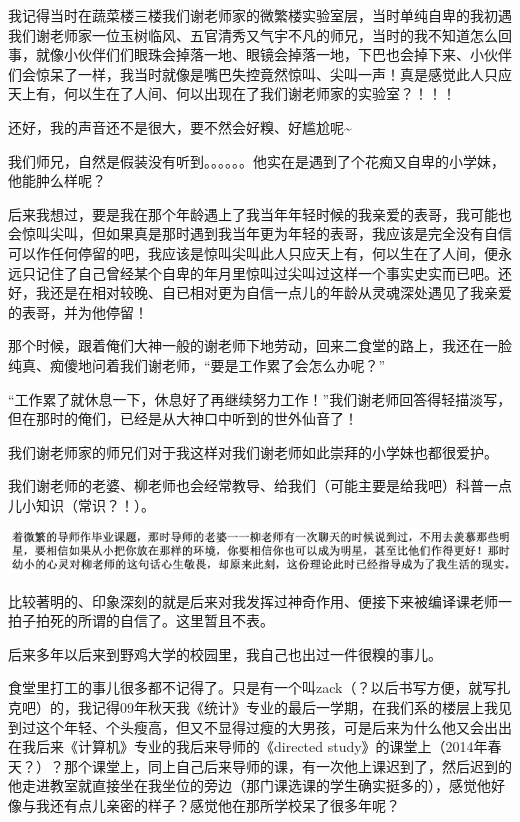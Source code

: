\documentclass[9pt, b5paper]{article}
\begin{document}
我记得当时在蔬菜楼三楼我们谢老师家的微繁楼实验室层，当时单纯自卑的我初遇我们谢老师家一位玉树临风、五官清秀又气宇不凡的师兄，当时的我不知道怎么回事，就像小伙伴们们眼珠会掉落一地、眼镜会掉落一地，下巴也会掉下来、小伙伴们会惊呆了一样，我当时就像是嘴巴失控竟然惊叫、尖叫一声！真是感觉此人只应天上有，何以生在了人间、何以出现在了我们谢老师家的实验室？！！！

还好，我的声音还不是很大，要不然会好糗、好尴尬呢\textasciitilde{}

我们师兄，自然是假装没有听到。。。。。。他实在是遇到了个花痴又自卑的小学妹，他能肿么样呢？

后来我想过，要是我在那个年龄遇上了我当年年轻时候的我亲爱的表哥，我可能也会惊叫尖叫，但如果真是那时遇到我当年更为年轻的表哥，我应该是完全没有自信可以作任何停留的吧，我应该是惊叫尖叫此人只应天上有，何以生在了人间，便永远只记住了自己曾经某个自卑的年月里惊叫过尖叫过这样一个事实史实而已吧。还好，我还是在相对较晚、自已相对更为自信一点儿的年龄从灵魂深处遇见了我亲爱的表哥，并为他停留！

那个时候，跟着俺们大神一般的谢老师下地劳动，回来二食堂的路上，我还在一脸纯真、痴傻地问着我们谢老师，“要是工作累了会怎么办呢？”

“工作累了就休息一下，休息好了再继续努力工作！”我们谢老师回答得轻描淡写，但在那时的俺们，已经是从大神口中听到的世外仙音了！

我们谢老师家的师兄们对于我这样对我们谢老师如此崇拜的小学妹也都很爱护。

我们谢老师的老婆、柳老师也会经常教导、给我们（可能主要是给我吧）科普一点儿小知识（常识？！）。

\begin{center}
\includegraphics[width=.9\linewidth]{./pic/backups_plans_20210502_171051.png}
\end{center}

比较著明的、印象深刻的就是后来对我发挥过神奇作用、便接下来被编译课老师一拍子拍死的所谓的自信了。这里暂且不表。 

后来多年以后来到野鸡大学的校园里，我自己也出过一件很糗的事儿。

食堂里打工的事儿很多都不记得了。只是有一个叫zack（？以后书写方便，就写扎克吧）的，我记得09年秋天我《统计》专业的最后一学期，在我们系的楼层上我见到过这个年轻、个头瘦高，但又不显得过瘦的大男孩，可是后来为什么他又会出出在我后来《计算机》专业的我后来导师的《directed study》的课堂上（2014年春天？）？那个课堂上，同上自己后来导师的课，有一次他上课迟到了，然后迟到的他走进教室就直接坐在我坐位的旁边（那门课选课的学生确实挺多的），感觉他好像与我还有点儿亲密的样子？感觉他在那所学校呆了很多年呢？
\end{document}
